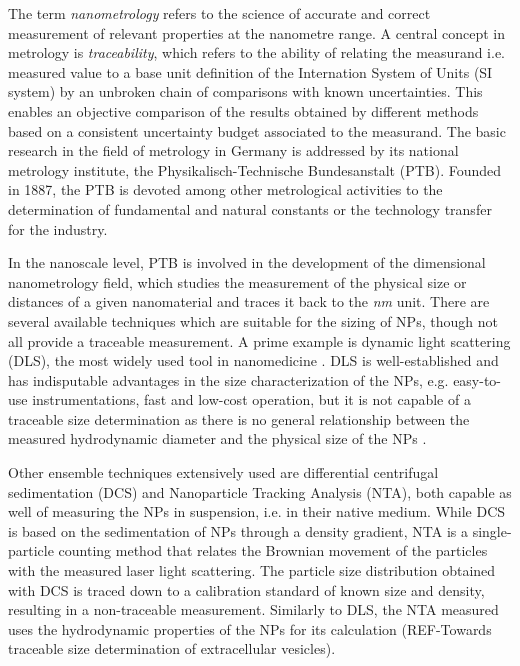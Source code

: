 The term \emph{nanometrology} refers to the science of accurate and correct measurement of relevant properties at the nanometre range. A central concept in metrology is \emph{traceability}, which refers to the ability of relating the measurand i.e. measured value to a base unit definition of the Internation System of Units (SI system) by an unbroken chain of comparisons with known uncertainties. This enables an objective comparison of the results obtained by different methods based on a consistent uncertainty budget associated to the measurand. The basic research in the field of metrology in Germany is addressed by its national metrology institute, the Physikalisch-Technische Bundesanstalt (PTB). Founded in 1887, the PTB is devoted among other metrological activities to the determination of fundamental and natural constants or the technology transfer for the industry.

In the nanoscale level, PTB is involved in the development of the dimensional nanometrology field, which studies the measurement of the physical size or distances of a given nanomaterial and traces it back to the \emph{nm} unit. There are several available techniques which are suitable for the sizing of NPs, though not all provide a traceable measurement. A prime example is dynamic light scattering (DLS), the most widely used tool in nanomedicine \citep{murphy_static_1997, hallett_vesicle_1991, egelhaaf_determination_1996, takahashi_precise_2008, jans_dynamic_2009, hoo_comparison_2008}. DLS is well-established and has indisputable advantages in the size characterization of the NPs, e.g. easy-to-use instrumentations, fast and low-cost operation, but it is not capable of a traceable size determination as there is no general relationship between the measured hydrodynamic diameter and the physical size of the NPs \citep{meli_traceable_2012}.

Other ensemble techniques extensively used are differential centrifugal sedimentation (DCS) \citep{fielding_correcting_2012} and Nanoparticle Tracking Analysis (NTA), both capable as well of measuring the NPs in suspension, i.e. in their native medium. While DCS is based on the sedimentation of NPs through a density gradient, NTA is a single-particle counting method that relates the Brownian movement of the particles with the measured laser light scattering. The particle size distribution obtained with DCS is traced down to a calibration standard of known size and density, resulting in a non-traceable measurement. Similarly to DLS, the NTA measured uses the hydrodynamic properties of the NPs for its calculation (REF-Towards traceable size determination of extracellular vesicles).

